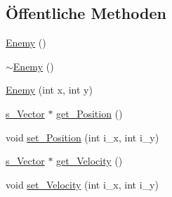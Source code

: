 \subsection*{Öffentliche Methoden}
\begin{DoxyCompactItemize}
\item 
\hyperlink{class_enemy_a94f30d348b6d2840fd71675472ba38dd}{Enemy} ()
\item 
\hyperlink{class_enemy_ac0eec4755e28c02688065f9657150ac3}{$\sim$\-Enemy} ()
\item 
\hyperlink{class_enemy_a98f0d2110309536798101b88d2d1d8c9}{Enemy} (int x, int y)
\item 
\hyperlink{structs___vector}{s\-\_\-\-Vector} $\ast$ \hyperlink{class_enemy_a8894742ec191ae32c4e22014e5af8246}{get\-\_\-\-Position} ()
\item 
void \hyperlink{class_enemy_a39b8b0f9a87bf2a7b6ee8a1f59cefcf4}{set\-\_\-\-Position} (int i\-\_\-x, int i\-\_\-y)
\item 
\hyperlink{structs___vector}{s\-\_\-\-Vector} $\ast$ \hyperlink{class_enemy_a01024ba4588c4ab2efc9a9e0a960c983}{get\-\_\-\-Velocity} ()
\item 
void \hyperlink{class_enemy_ab026b4302720f1676653285b27babd59}{set\-\_\-\-Velocity} (int i\-\_\-x, int i\-\_\-y)
\end{DoxyCompactItemize}


